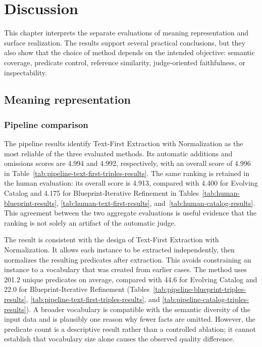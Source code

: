 
\chapter{Discussion}

This chapter interprets the separate evaluations of meaning representation and
surface realization. The results support several practical conclusions, but
they also show that the choice of method depends on the intended objective:
semantic coverage, predicate control, reference similarity, judge-oriented
faithfulness, or inspectability.

\section{Meaning representation}

\subsection{Pipeline comparison}

The pipeline results identify Text-First Extraction with Normalization as the
most reliable of the three evaluated methods. Its automatic additions and
omissions scores are 4.994 and 4.992, respectively, with an overall score of
4.996 in Table~\ref{tab:pipeline-text-first-triples-results}. The same ranking
is retained in the human evaluation: its overall score is 4.913, compared with
4.400 for Evolving Catalog and 4.175 for Blueprint-Iterative Refinement in
Tables~\ref{tab:human-blueprint-results}, \ref{tab:human-text-first-results},
and~\ref{tab:human-catalog-results}. This agreement between the two aggregate
evaluations is useful evidence that the ranking is not solely an artifact of
the automatic judge.

The result is consistent with the design of Text-First Extraction with
Normalization. It allows each instance to be extracted independently, then
normalizes the resulting predicates after extraction. This avoids constraining
an instance to a vocabulary that was created from earlier cases. The method
uses 201.2 unique predicates on average, compared with 44.6 for Evolving
Catalog and 22.0 for Blueprint-Iterative Refinement
(Tables~\ref{tab:pipeline-blueprint-triples-results}, \ref{tab:pipeline-text-first-triples-results},
and \ref{tab:pipeline-catalog-triples-results}). A broader vocabulary is
compatible with the semantic diversity of the input data and is plausibly one
reason why fewer facts are omitted. However, the predicate count is a
descriptive result rather than a controlled ablation; it cannot establish that
vocabulary size alone causes the observed quality difference.

